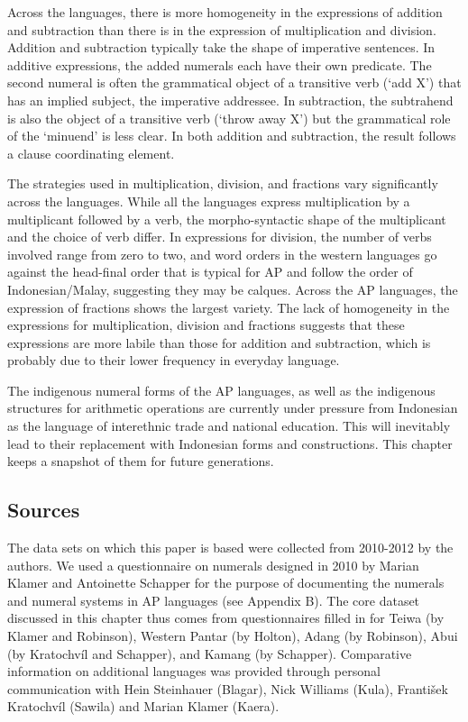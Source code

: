 Across the languages, there is more homogeneity in the expressions of addition and subtraction than there is in the expression of multiplication and division. Addition and subtraction typically take the shape of imperative sentences. In additive expressions, the added numerals each have their own predicate. The second numeral is often the grammatical object of a transitive verb (`add X') that has an implied subject, the imperative addressee. In subtraction, the subtrahend is also the object of a transitive verb (`throw away X') but the grammatical role of the `minuend' is less clear. In both addition and subtraction, the result follows a clause coordinating element.

The strategies used in multiplication, division, and fractions vary significantly across the languages. While all the languages express multiplication by a multiplicant followed by a verb, the morpho-syntactic shape of the multiplicant and the choice of verb differ. In expressions for division, the number of verbs involved range from zero to two, and word orders in the western languages go against the head-final order that is typical for AP and follow the order of Indonesian/Malay, suggesting they may be calques. Across the AP languages, the expression of fractions shows the largest variety. The lack of homogeneity in the expressions for multiplication, division and fractions suggests that these expressions are more labile than those for addition and subtraction, which is probably due to their lower frequency in everyday language.

The indigenous numeral forms of the AP languages, as well as the indigenous structures for arithmetic operations are currently under pressure from Indonesian as the language of interethnic trade and national education. This will inevitably lead to their replacement with Indonesian forms and constructions. This chapter keeps a snapshot of them for future generations. 

\subsection{Sources}
\label{sec:8:Sources}
The data sets on which this paper is based were collected from 2010-2012 by the authors. We used a questionnaire on numerals designed in 2010 by Marian Klamer and Antoinette Schapper for the purpose of documenting the numerals and numeral systems in AP languages (see Appendix B). The core dataset discussed in this chapter thus comes from questionnaires filled in for Teiwa (by Klamer and Robinson), Western Pantar (by Holton), Adang (by Robinson), Abui (by Kratochv\'il and Schapper), and Kamang (by Schapper). Comparative information on additional languages was provided through personal communication with Hein Steinhauer (Blagar), Nick Williams (Kula), Franti{\v{s}}ek Kratochv\'il (Sawila) and Marian Klamer (Kaera).

